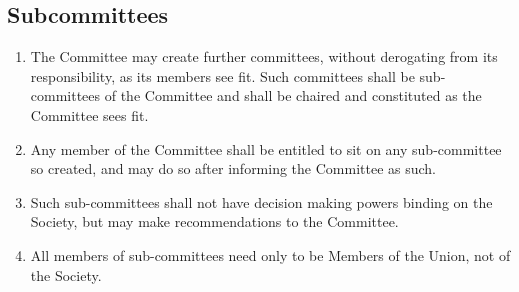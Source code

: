 \documentclass[a4paper]{tufte-handout}
\begin{document}
\subsection{Subcommittees}
\begin{enumerate}[resume]
    \item The Committee may create further committees, without derogating from its responsibility, as its members see fit. Such committees shall be sub-committees of the Committee and shall be chaired and constituted as the Committee sees fit.
    \item Any member of the Committee shall be entitled to sit on any sub-committee so created, and may do so after informing the Committee as such.
    \item Such sub-committees shall not have decision making powers binding on the Society, but may make recommendations to the Committee.
    \item All members of sub-committees need only to be Members of the Union, not of the Society.
\end{enumerate}
\end{document}
